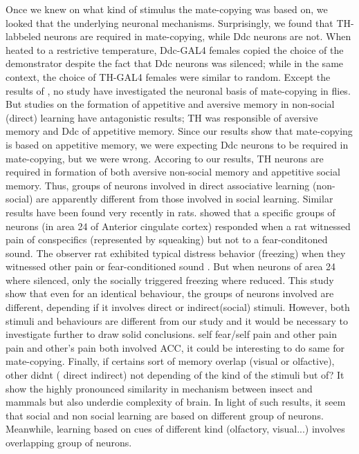 \documentclass[a4paper, 12pt]{article}
\begin{document}
Once we knew on what kind of stimulus the mate-copying was based on, we looked that the underlying neuronal mechanisms. 
Surprisingly, we found that TH-labbeled neurons are required in mate-copying, while Ddc neurons are not. 
When heated to a restrictive temperature, Ddc-GAL4 females copied the choice of the demonstrator despite the fact that Ddc neurons was silenced; while in the same context, the choice of TH-GAL4 females were similar to random. 
Except the results of \textcite{monier_dopamine_2018}, no study have investigated the neuronal basis of mate-copying in flies. But studies on the formation of appetitive and aversive memory in non-social (direct) learning have antagonistic results; TH was responsible of aversive memory and Ddc of appetitive memory. Since our results show that mate-copying is based on appetitive memory, we were expecting Ddc neurons to be required in mate-copying, but we were wrong.
Accoring to our results, TH neurons are required in formation of both aversive non-social memory and appetitive social memory. Thus, groups of neurons involved in direct associative learning (non-social) are apparently different from those involved in social learning. Similar results have been found very recently in rats. \textcite{carrillo_emotional_2019} showed that a specific groups of neurons (in area 24 of Anterior cingulate cortex) responded when a rat witnessed pain of conspecifics (represented by squeaking)  but not to a fear-conditoned sound. The observer rat exhibited typical distress behavior (freezing) when they witnessed other pain or fear-conditioned sound . But when neurons of area 24 where silenced, only the socially triggered freezing where reduced. This study show that even for an identical behaviour, the groups of neurons involved are different, depending if it involves direct or indirect(social) stimuli. However, both stimuli and behaviours are different from our study and it would be necessary to investigate further to draw solid conclusions.
self fear/self pain and other pain
 pain and other's pain both involved ACC, it could be interesting to do same for mate-copying.
Finally, if certains sort of memory overlap (visual or olfactive), other didnt ( direct indirect) not depending of the kind of the stimuli but of?
It show the highly pronounced similarity in mechanism between insect and mammals but also underdie complexity of brain.
In light of such results, it seem that social and non social learning are based on different group of neurons. Meanwhile, learning based on cues of different kind (olfactory, visual...) involves overlapping group of neurons. 
\end{document}
